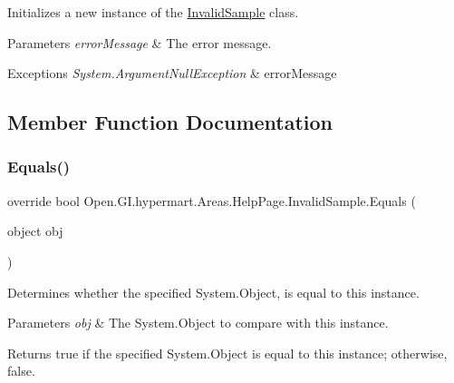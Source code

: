 Initializes a new instance of the \hyperlink{class_open_1_1_g_i_1_1hypermart_1_1_areas_1_1_help_page_1_1_invalid_sample}{Invalid\+Sample} class. 


\begin{DoxyParams}{Parameters}
{\em error\+Message} & The error message.\\
\hline
\end{DoxyParams}

\begin{DoxyExceptions}{Exceptions}
{\em System.\+Argument\+Null\+Exception} & error\+Message\\
\hline
\end{DoxyExceptions}


\subsection{Member Function Documentation}
\hypertarget{class_open_1_1_g_i_1_1hypermart_1_1_areas_1_1_help_page_1_1_invalid_sample_a3c5afe0e3460fccc63bb2b058cf13a8d}{}\label{class_open_1_1_g_i_1_1hypermart_1_1_areas_1_1_help_page_1_1_invalid_sample_a3c5afe0e3460fccc63bb2b058cf13a8d} 
\subsubsection{\texorpdfstring{Equals()}{Equals()}}
{\footnotesize\ttfamily override bool Open.\+G\+I.\+hypermart.\+Areas.\+Help\+Page.\+Invalid\+Sample.\+Equals (\begin{DoxyParamCaption}\item[{object}]{obj }\end{DoxyParamCaption})}



Determines whether the specified System.\+Object, is equal to this instance. 


\begin{DoxyParams}{Parameters}
{\em obj} & The System.\+Object to compare with this instance.\\
\hline
\end{DoxyParams}
\begin{DoxyReturn}{Returns}
{\ttfamily true} if the specified System.\+Object is equal to this instance; otherwise, {\ttfamily false}. 
\end{DoxyReturn}
\hypertarget{class_open_1_1_g_i_1_1hypermart_1_1_areas_1_1_help_page_1_1_invalid_sample_a804d4354478ebcdab08f85e34f138496}{}\label{class_open_1_1_g_i_1_1hypermart_1_1_areas_1_1_help_page_1_1_invalid_sample_a804d4354478ebcdab08f85e34f138496} 
